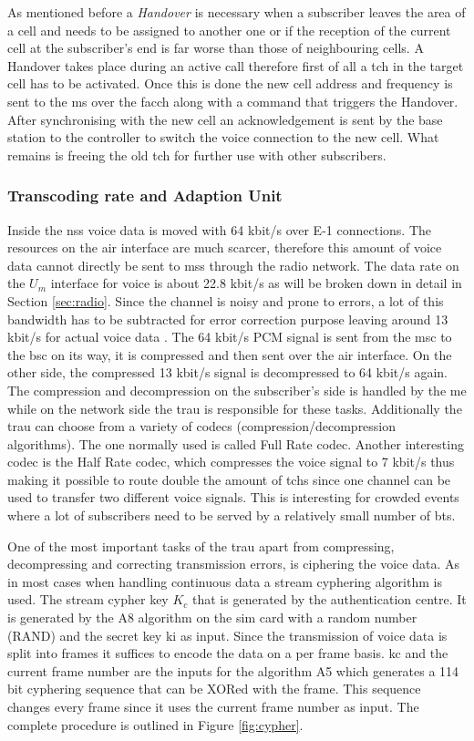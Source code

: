 As mentioned before a \emph{Handover} is necessary when a subscriber leaves the area of a cell and needs to be assigned to another one or if the reception of the current cell at the subscriber's end is far worse than those of neighbouring cells.
A Handover takes place during an active call therefore first of all a \gls{tch} in the target cell has to be activated.
Once this is done the new cell address and frequency is sent to the \gls{ms} over the \gls{facch} along with a command that triggers the Handover.
After synchronising with the new cell an acknowledgement is sent by the base station to the controller to switch the voice connection to the new cell.
What remains is freeing the old \gls{tch} for further use with other subscribers.

\subsubsection{Transcoding rate and Adaption Unit}
Inside the \gls{nss} voice data is moved with 64 kbit/s over E-1 connections.
The resources on the air interface are much scarcer, therefore this amount of voice data cannot directly be sent to \glspl{ms} through the radio network.
The data rate on the $U_m$ interface for voice is about 22.8 kbit/s as will be broken down in detail in Section \ref{sec:radio}.
Since the channel is noisy and prone to errors, a lot of this bandwidth has to be subtracted for error correction purpose leaving around 13 kbit/s for actual voice data \cite{kommsys2006}.
The 64 kbit/s PCM signal is sent from the \gls{msc} to the \gls{bsc} on its way, it is compressed and then sent over the air interface.
On the other side, the compressed 13 kbit/s signal is decompressed to 64 kbit/s again.
The compression and decompression on the subscriber's side is handled by the \gls{me} while on the network side the \gls{trau} is responsible for these tasks.
Additionally the \gls{trau} can choose from a variety of codecs (compression/decompression algorithms).
The one normally used is called Full Rate codec.
Another interesting codec is the Half Rate codec, which compresses the voice signal to 7 kbit/s thus making it possible to route double the amount of \glspl{tch} since one channel can be used to transfer two different voice signals.
This is interesting for crowded events where a lot of subscribers need to be served by a relatively small number of \gls{bts}.

One of the most important tasks of the \gls{trau} apart from compressing, decompressing and correcting transmission errors, is ciphering the voice data.
As in most cases when handling continuous data a stream cyphering algorithm is used.
The stream cypher key $K_c$ that is generated by the authentication centre.
It is generated by the A8 algorithm on the \gls{sim} card with a random number (RAND) and the secret key \gls{ki} as input.
Since the transmission of voice data is split into frames it suffices to encode the data on a per frame basis.
\gls{kc} and the current frame number are the inputs for the algorithm A5 which generates a 114 bit cyphering sequence that can be XORed with the frame.
This sequence changes every frame since it uses the current frame number as input.
The complete procedure is outlined in Figure \ref{fig:cypher}.

